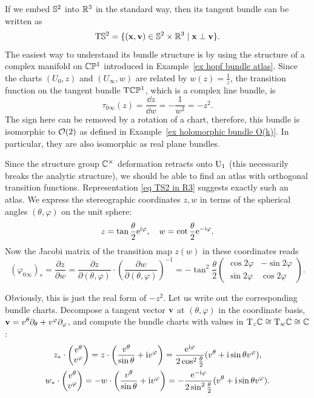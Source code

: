 \begin{example}\label{ex tangent bundle of S2}
    If we embed $\bbS^2$ into $\bbR^3$ in the standard way, then its tangent bundle can be written as
    \[\T\bbS^2=\{(\bf{x},\bf{v})\in \bbS^2\times\bbR^3\mid \bf{x}\perp\bf{v}\}.\label{eq TS2 in R3}\]
    The easiest way to understand its bundle structure is by using the structure of a complex manifold on $\CP^1$ introduced in Example~\ref{ex hopf bundle atlas}. Since the charts $(U_0,z)$ and $(U_\infty,w)$ are related by $w(z)=\frac{1}{z}$, the transition function on the tangent bundle $\T\CP^1$, which is a complex line bundle, is 
    \[\tau_{0\infty}(z)=\frac{\dd z}{\dd w}=-\frac{1}{w^2}=-z^2.\]
    The sign here can be removed by a rotation of a chart, therefore, this bundle is isomorphic to $\calO(2)$ as defined in Example~\ref{ex holomorphic bundle O(k)}. In particular, they are also isomorphic as real plane bundles.

    Since the structure group $\bbC^\times$ deformation retracts onto $\U_1$ (this necessarily breaks the analytic structure), we should be able to find an atlas with orthogonal transition functions. Representation \eqref{eq TS2 in R3} suggests exactly such an atlas. We express the stereographic coordinates $z,w$ in terms of the spherical angles $(\theta,\varphi)$ on the unit sphere:
    \[z=\tan\frac{\theta}{2}\rme^{\rmi\varphi},\quad w=\cot\frac{\theta}{2}\rme^{-\rmi\varphi}.\]
    Now the Jacobi matrix of the transition map $z(w)$ in these coordinates reads
    \[(\varphi_{0\infty})_\ast=\frac{\partial z}{\partial w}=\frac{\partial z}{\partial (\theta,\varphi)}\cdot\left(\frac{\partial w}{\partial (\theta,\varphi)}\right)^{-1}=-\tan^2\frac{\theta}{2}
    \begin{pmatrix}
        \cos2\varphi&-\sin2\varphi\\
        \sin2\varphi& \cos2\varphi
    \end{pmatrix}.
    \]

    Obviously, this is just the real form of $-z^2$. Let us write out the corresponding bundle charts. Decompose a tangent vector $\bf{v}$ at $(\theta,\varphi)$ in the coordinate basis, $\bf{v}=v^\theta\partial_\theta+v^\varphi\partial_\varphi$, and compute the bundle charts with values in $\T_z\bbC\cong \T_w\bbC\cong\bbC$:
    \begin{gather}
        z_\ast\cdot\begin{pmatrix}
            v^\theta\\v^\varphi
        \end{pmatrix}=z \cdot \left(\frac{v^\theta}{\sin\theta}+\rmi v^\varphi\right)=\frac{\rme^{\rmi\varphi}}{2\cos^2\frac{\theta}{2}}(v^\theta+\rmi\sin\theta v^\varphi),\\
        w_\ast\cdot\begin{pmatrix}
            v^\theta\\v^\varphi
        \end{pmatrix}=-w\cdot \left(\frac{v^\theta}{\sin\theta}+\rmi v^\varphi\right)=-\frac{\rme^{-\rmi\varphi}}{2\sin^2\frac{\theta}{2}}(v^\theta+\rmi\sin\theta v^\varphi).
    \end{gather}


\end{example}
